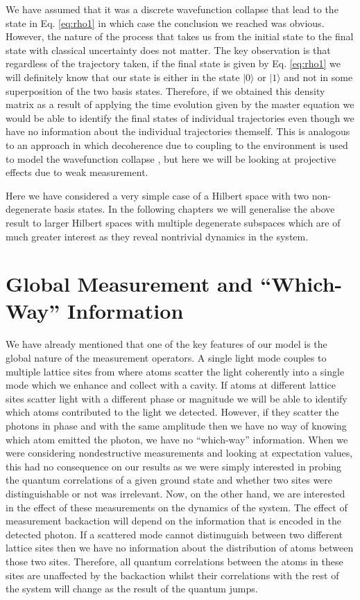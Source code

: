 We have assumed that it was a discrete wavefunction collapse that lead
to the state in Eq. \eqref{eq:rho1} in which case the conclusion we
reached was obvious. However, the nature of the process that takes us
from the initial state to the final state with classical uncertainty
does not matter. The key observation is that regardless of the
trajectory taken, if the final state is given by Eq. \eqref{eq:rho1}
we will definitely know that our state is either in the state
$| 0 \rangle$ or $| 1 \rangle$ and not in some superposition of the
two basis states. Therefore, if we obtained this density matrix as a
result of applying the time evolution given by the master equation we
would be able to identify the final states of individual trajectories
even though we have no information about the individual trajectories
themself. This is analogous to an approach in which decoherence due to
coupling to the environment is used to model the wavefunction collapse
\cite{zurek2002}, but here we will be looking at projective effects
due to weak measurement.

Here we have considered a very simple case of a Hilbert space with two
non-degenerate basis states. In the following chapters we will
generalise the above result to larger Hilbert spaces with multiple
degenerate subspaces which are of much greater interest as they reveal
nontrivial dynamics in the system.

\section{Global Measurement and ``Which-Way'' Information}

We have already mentioned that one of the key features of our model is
the global nature of the measurement operators. A single light mode
couples to multiple lattice sites from where atoms scatter the light
coherently into a single mode which we enhance and collect with a
cavity. If atoms at different lattice sites scatter light with a
different phase or magnitude we will be able to identify which atoms
contributed to the light we detected. However, if they scatter the
photons in phase and with the same amplitude then we have no way of
knowing which atom emitted the photon, we have no ``which-way''
information. When we were considering nondestructive measurements and
looking at expectation values, this had no consequence on our results
as we were simply interested in probing the quantum correlations of a
given ground state and whether two sites were distinguishable or not
was irrelevant. Now, on the other hand, we are interested in the
effect of these measurements on the dynamics of the system. The effect
of measurement backaction will depend on the information that is
encoded in the detected photon. If a scattered mode cannot
distinuguish between two different lattice sites then we have no
information about the distribution of atoms between those two sites.
Therefore, all quantum correlations between the atoms in these sites
are unaffected by the backaction whilst their correlations with the
rest of the system will change as the result of the quantum jumps.

